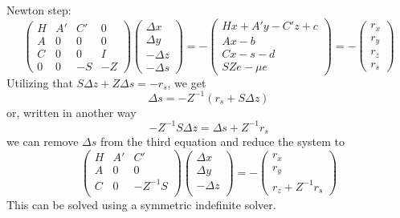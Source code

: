 \documentclass{article}
\begin{document}
Newton step:
\[
\left(
\begin{array}{cccc}
H & A' & C' & 0 \\
A & 0 & 0 & 0\\
C & 0 & 0 & I\\
0 & 0 & -S & -Z
\end{array}
\right)
\left(
\begin{array}{c}
\Delta x\\
\Delta y\\
-\Delta z\\
-\Delta s
\end{array}
\right)
=
-\left(
\begin{array}{c}
Hx + A' y - C' z + c\\
A x - b\\
C x - s - d\\
S Z e - \mu e
\end{array}
\right) =
-\left(
\begin{array}{c}
r_x\\
r_y\\
r_z\\
r_s
\end{array}
\right)
\]
Utilizing that $S \Delta z + Z \Delta s = -r_s$, we get
\[
\Delta s = -Z^{-1} (r_s + S \Delta z)
\]
or, written in another way
\[
-Z^{-1} S \Delta z = \Delta s + Z^{-1} r_s
\]
we can remove $\Delta s$ from the third equation and reduce the system to
\[
\left(
\begin{array}{cccc}
H & A' & C' \\
A & 0 & 0 \\
C & 0 & -Z^{-1} S \\
\end{array}
\right)
\left(
\begin{array}{c}
\Delta x\\
\Delta y\\
-\Delta z\\
\end{array}
\right)
=
-\left(
\begin{array}{c}
r_x\\
r_y \\
r_z + Z^{-1} r_s
\end{array}
\right)
\]
This can be solved using a symmetric indefinite solver.
\end{document}

